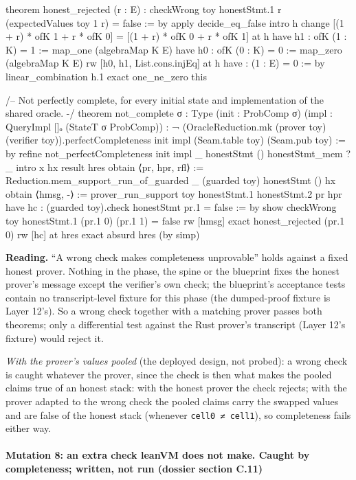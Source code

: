 \begin{leancode}
theorem honest_rejected (r : E) : checkWrong toy honestStmt.1 r (expectedValues toy 1 r) = false := by
  apply decide_eq_false
  intro h
  change [(1 + r) * ofK 1 + r * ofK 0] = [(1 + r) * ofK 0 + r * ofK 1] at h
  have h1 : ofK (1 : K) = 1 := map_one (algebraMap K E)
  have h0 : ofK (0 : K) = 0 := map_zero (algebraMap K E)
  rw [h0, h1, List.cons.injEq] at h
  have : (1 : E) = 0 := by linear_combination h.1
  exact one_ne_zero this

/-- Not perfectly complete, for every initial state and implementation of the shared oracle. -/
theorem not_complete {σ : Type} (init : ProbComp σ) (impl : QueryImpl []ₒ (StateT σ ProbComp)) :
    ¬ (OracleReduction.mk (prover toy) (verifier toy)).perfectCompleteness init impl
      (Seam.table toy) (Seam.pub toy) := by
  refine not_perfectCompleteness init impl _ honestStmt () honestStmt_mem ?_
  intro x hx result hres
  obtain ⟨pr, hpr, rfl⟩ := Reduction.mem_support_run_of_guarded _ (guarded toy) honestStmt () hx
  obtain ⟨hmsg, -⟩ := prover_run_support toy honestStmt.1 honestStmt.2 pr hpr
  have hc : (guarded toy).check honestStmt pr.1 = false := by
    show checkWrong toy honestStmt.1 (pr.1 0) (pr.1 1) = false
    rw [hmsg]
    exact honest_rejected (pr.1 0)
  rw [hc] at hres
  exact absurd hres (by simp)
\end{leancode}

\textbf{Reading.} \enquote{A wrong check makes completeness unprovable} holds against a fixed honest prover. Nothing in the phase, the spine or the blueprint fixes the honest prover's message except the verifier's own check; the blueprint's acceptance tests contain no transcript-level fixture for this phase (the dumped-proof fixture is Layer 12's). So a wrong check together with a matching prover passes both theorems; only a differential test against the Rust prover's transcript (Layer 12's fixture) would reject it.

\emph{With the prover's values pooled} (the deployed design, not probed): a wrong check is caught whatever the prover, since the check is then what makes the pooled claims true of an honest stack: with the honest prover the check rejects; with the prover adapted to the wrong check the pooled claims carry the swapped values and are false of the honest stack (whenever \texttt{cell0 ≠ cell1}), so completeness fails either way.

\paragraph{Mutation 8: an extra check leanVM does not make. Caught by completeness; written, not run (dossier section C.11)}\label{sec:gen-pubinput-C11}

